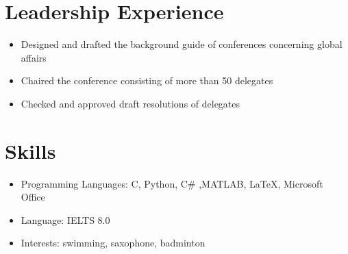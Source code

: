 \documentclass{resume}
\begin{document}
\section{Leadership Experience}


\begin{itemize}
  \item Designed and drafted the background guide of conferences concerning global affairs
  \item Chaired the conference consisting of more than 50 delegates
  \item Checked and approved draft resolutions of delegates
\end{itemize}


\section{Skills}
\begin{itemize}[parsep=0.5ex]
  \item Programming Languages: C, Python, C\# ,MATLAB, \LaTeX, Microsoft Office
  \item Language: IELTS 8.0
  \item Interests: swimming, saxophone, badminton %
\end{itemize}
\end{document}
